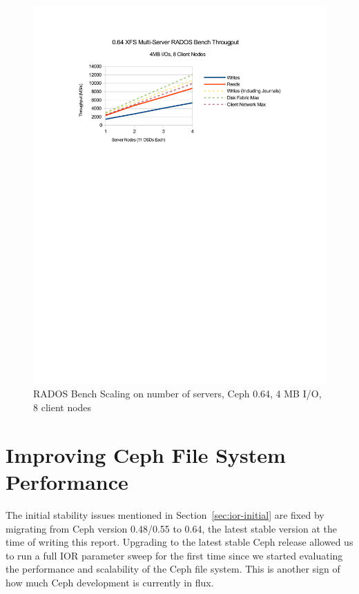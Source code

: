 \documentclass{article}
\begin{document}

\begin{figure}[htb]
\centering
\includegraphics[width=5in]{rados-064-oss}
\caption{RADOS Bench Scaling on number of servers, Ceph 0.64, 4 MB I/O, 8 client
nodes}
\label{fig:rados-064-oss}
\end{figure}



\section{Improving Ceph File System Performance}
\label{sec:improve-ior}

The initial stability issues mentioned in Section~\ref{sec:ior-initial} are
fixed by migrating from Ceph version 0.48/0.55 to 0.64, the latest stable version at the
time of writing this report.  Upgrading to the latest stable Ceph release
allowed us to run a full IOR parameter sweep for the first time since we
started evaluating the performance and scalability of the Ceph file system.
This is another sign of how much Ceph development is currently in flux.
\end{document}
